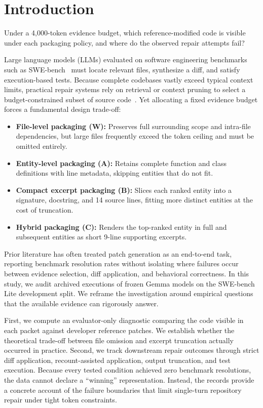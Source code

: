 \documentclass[11pt]{article}
\begin{document}
\section{Introduction}

Under a 4{,}000-token evidence budget, which reference-modified code is
visible under each packaging policy, and where do the observed repair
attempts fail?

Large language models (LLMs) evaluated on software engineering benchmarks
such as SWE-bench~\cite{jimenez2024swebench} must locate relevant files,
synthesize a diff, and satisfy execution-based tests.  Because complete
codebases vastly exceed typical context limits, practical repair systems
rely on retrieval or context pruning to select a budget-constrained
subset of source code~\cite{xia2024agentless,jia2026swezze}.  Yet
allocating a fixed evidence budget forces a fundamental design trade-off:

\begin{itemize}[nosep]
  \item \textbf{File-level packaging (W):} Preserves full surrounding scope
    and intra-file dependencies, but large files frequently exceed the
    token ceiling and must be omitted entirely.
  \item \textbf{Entity-level packaging (A):} Retains complete function and
    class definitions with line metadata, skipping entities that do not fit.
  \item \textbf{Compact excerpt packaging (B):} Slices each ranked entity
    into a signature, docstring, and 14 source lines, fitting more distinct
    entities at the cost of truncation.
  \item \textbf{Hybrid packaging (C):} Renders the top-ranked entity in
    full and subsequent entities as short 9-line supporting excerpts.
\end{itemize}

Prior literature has often treated patch generation as an end-to-end task,
reporting benchmark resolution rates without isolating where failures
occur between evidence selection, diff application, and behavioral
correctness.  In this study, we audit archived executions of frozen Gemma
models on the SWE-bench Lite development split.  We reframe the
investigation around empirical questions that the available evidence can
rigorously answer.

First, we compute an evaluator-only diagnostic comparing the code visible
in each packet against developer reference patches.  We establish whether
the theoretical trade-off between file omission and excerpt truncation
actually occurred in practice.  Second, we track downstream repair
outcomes through strict diff application, recount-assisted application,
output truncation, and test execution.  Because every tested condition
achieved zero benchmark resolutions, the data cannot declare a ``winning''
representation.  Instead, the records provide a concrete account of the
failure boundaries that limit single-turn repository repair under tight
token constraints.
\end{document}
